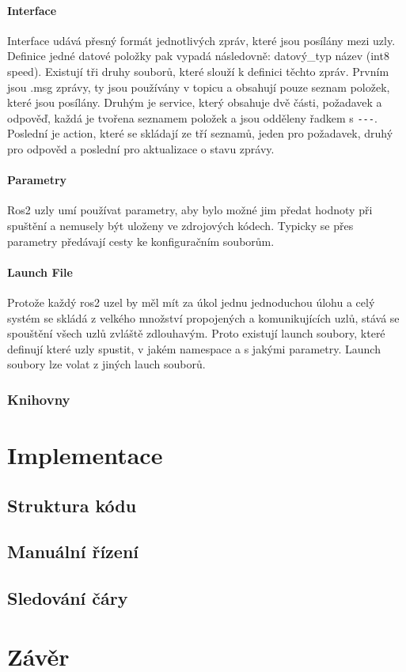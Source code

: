 \subsubsection*{Interface}
Interface udává přesný formát jednotlivých zpráv, které jsou posílány mezi uzly.
Definice jedné datové položky pak vypadá následovně: datový\_typ název (int8 speed).
Existují tři %
druhy souborů, které slouží k definici těchto zpráv. Prvním jsou .msg zprávy, ty jsou používány v topicu a obsahují pouze seznam položek, které jsou posílány. Druhým je service, který obsahuje dvě části, požadavek a odpověď, každá je tvořena seznamem položek a jsou odděleny řadkem s \verb|---|. Poslední je action, které se skládají ze tří seznamů, jeden pro požadavek, druhý pro odpověd a poslední pro aktualizace o stavu zprávy.

\subsubsection*{Parametry} %
Ros2 uzly umí používat parametry, aby bylo možné jim předat hodnoty při spuštění a nemusely být uloženy ve zdrojových kódech. Typicky se přes parametry předávají cesty ke konfiguračním souborům. 

\subsubsection*{Launch File} %
Protože každý ros2 uzel by měl mít za úkol jednu jednoduchou úlohu a celý systém se skládá z velkého množství propojených a komunikujících uzlů, stává se spouštění všech uzlů zvláště zdlouhavým. Proto existují launch soubory, které definují které uzly spustit, v jakém namespace a s jakými parametry. Launch soubory lze volat z jiných lauch souborů. %

\subsection*{Knihovny}




\chapter{Implementace} %
\section{Struktura kódu}
\section{Manuální řízení}
\section{Sledování čáry}

\chapter{Závěr}



%
